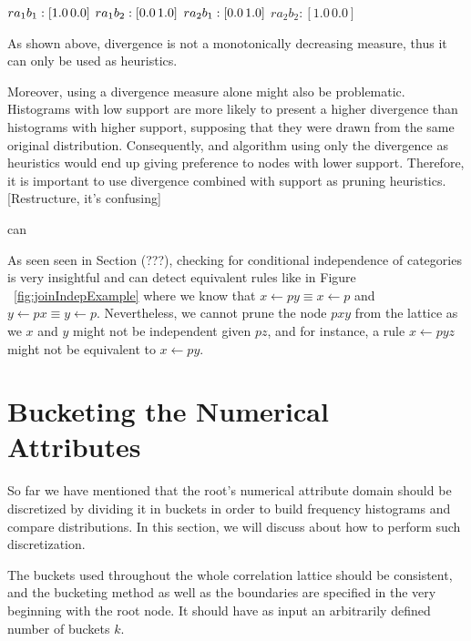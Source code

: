 $r a_1 b_1 : [1.0 \, 0.0] \\$
$r a_1 b_2 : [0.0 \, 1.0] \\$
$r a_2 b_1 : [0.0 \, 1.0] \\$
$r a_2 b_2 : [1.0 \, 0.0]$

As shown above, divergence is not a monotonically decreasing measure, thus it can only be used as heuristics.


Moreover, using a divergence measure alone might also be problematic. Histograms with low support are more likely to
present a higher divergence than histograms with higher support, supposing that they were drawn from the same original
distribution. Consequently, and algorithm using only the divergence as heuristics would end up giving preference to
nodes with lower support. Therefore, it is important to use divergence combined with support as pruning heuristics.
[Restructure, it's confusing]

can



As seen seen in Section (???), checking for conditional independence of categories is very insightful and
can detect equivalent rules like in Figure ~\ref{fig:joinIndepExample} where we know that 
$x \leftarrow py \equiv x \leftarrow p$ and $y \leftarrow px \equiv y \leftarrow p$. Nevertheless, we cannot prune the
node $pxy$ from the lattice as we $x$ and $y$ might not be independent given $pz$, and for instance, a rule $x
\leftarrow pyz$ might not be equivalent to $x \leftarrow py$.

\section{Bucketing the Numerical Attributes}

So far we have mentioned that the root's numerical attribute domain should be discretized by dividing it in buckets in
order to build frequency histograms and compare distributions. In this section, we will discuss about how to perform
such discretization.

The buckets used throughout the whole correlation lattice should be consistent, and the bucketing method as well as
the
boundaries are specified in the very beginning with the root node. It should have as input an arbitrarily defined
number
of buckets $k$.

